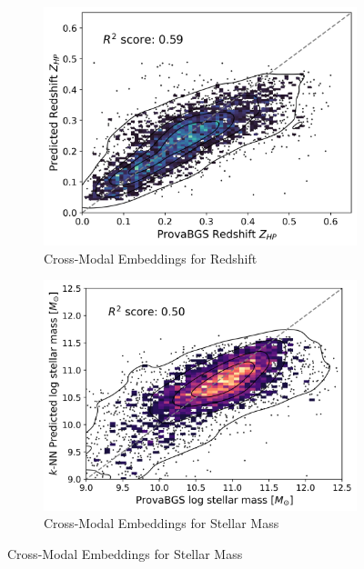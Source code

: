 \documentclass[a4paper,12pt]{article}
\begin{document}
\begin{figure}[H]
    \begin{subfigure}[b]{0.48\textwidth}
        \centering
        \includegraphics[width=\textwidth]{../figures/zeroshot_redshift_crossmodal.png}
        \caption{Cross-Modal Embeddings for Redshift}
        \label{fig:redshift_crossmodal}
    \end{subfigure}%
    \hfill
    \begin{subfigure}[b]{0.48\textwidth}
        \centering
        \includegraphics[width=\textwidth]{../figures/zeroshot_stellarmass_crossmodal.png}
        \caption{Cross-Modal Embeddings for Stellar Mass}
        \label{fig:stellarmass_crossmodal}
    \end{subfigure}


\end{figure}
\end{document}
